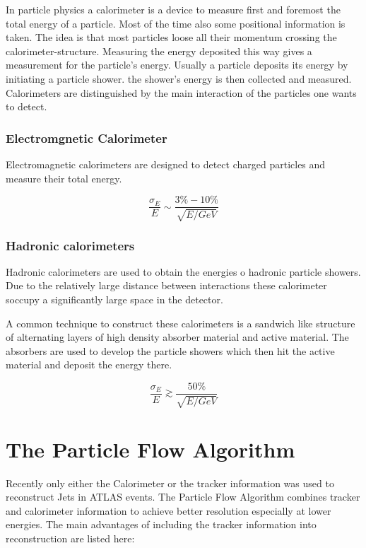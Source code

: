 In particle physics a calorimeter is a device to measure first and foremost the total energy of a particle. Most of the time also some positional information is taken.
The idea is that most particles loose all their momentum crossing the calorimeter-structure. Measuring the energy deposited this way gives a measurement for the particle's energy.
Usually a particle deposits its energy by initiating a particle shower. the shower's energy is then collected and measured.
Calorimeters are distinguished by the main interaction of the particles one wants to detect. 
\subsubsection{Electromgnetic Calorimeter}

Electromagnetic calorimeters are designed to detect charged particles and measure their total energy.

\begin{equation}
\frac{\sigma_E}{E} \sim \frac{3 \% - 10 \%}{\sqrt{E/GeV}}
\end{equation}

\subsubsection{Hadronic calorimeters}

Hadronic calorimeters are used to obtain the energies o hadronic particle showers.
Due to the relatively large distance between interactions these calorimeter soccupy a significantly large space in the detector.

A common technique to construct these calorimeters is a sandwich like structure of alternating layers of high density absorber material and active material. 
The absorbers are used to develop the particle showers which then hit the active material and deposit the energy there.

\begin{equation}
\frac{\sigma_E}{E} \gtrsim \frac{50 \%}{\sqrt{E/GeV}}
\end{equation}






\section{The Particle Flow Algorithm}

Recently only either the Calorimeter or the tracker information was used to reconstruct Jets in ATLAS events. The Particle Flow Algorithm combines tracker and calorimeter information to achieve better resolution especially at lower energies. The main advantages of including the tracker information into reconstruction are listed here:


